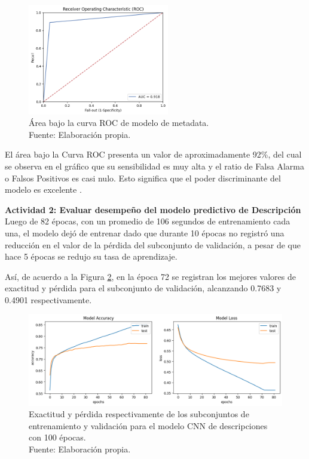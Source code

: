 \begin{figure}[!ht]
	\begin{center}
		\includegraphics[width=0.55\textwidth]{5/figures/metadata_auc.png}
		\caption[Área bajo la curva ROC de modelo de metadata]{Área bajo la curva ROC de modelo de metadata.\\
		Fuente: Elaboración propia.}
		\label{5:fig3}
	\end{center}
\end{figure}

El área bajo la Curva ROC presenta un valor de aproximadamente 92\%, del cual se observa en el gráfico que su sensibilidad es muy alta y el ratio de Falsa Alarma o Falsos Positivos es casi nulo. Esto significa que el poder discriminante del modelo es excelente \parencite{bk_britos2006datamining}.

\textbf{Actividad 2: Evaluar desempeño del modelo predictivo de Descripción}
\\
Luego de 82 épocas, con un promedio de 106 segundos de entrenamiento cada una, el modelo dejó de entrenar dado que durante 10 épocas no registró una reducción en el valor de la pérdida del subconjunto de validación, a pesar de que hace 5 épocas se redujo su tasa de aprendizaje.

Así, de acuerdo a la Figura \ref{5:fig4}, en la época 72 se registran los mejores valores de exactitud y pérdida para el subconjunto de validación, alcanzando 0.7683 y 0.4901 respectivamente.

\begin{figure}[!ht]
	\begin{center}
		\includegraphics[width=1\textwidth]{5/figures/description_model_acc_loss.png}
		\caption[Exactitud y pérdida respectivamente de los subconjuntos de entrenamiento y validación para el modelo CNN de descripciones con 100 épocas]{Exactitud y pérdida respectivamente de los subconjuntos de entrenamiento y validación para el modelo CNN de descripciones con 100 épocas.\\
		Fuente: Elaboración propia.}
		\label{5:fig4}
	\end{center}
\end{figure}

